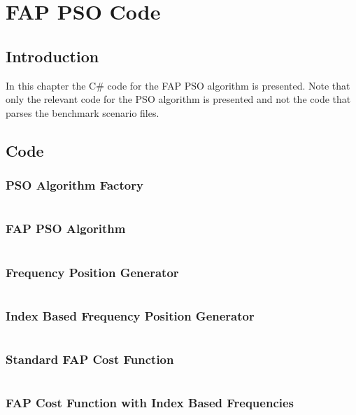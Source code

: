 \appendix
\label{chpt:apxFAPPSO}
\chapter{FAP PSO Code}
\section{Introduction}
In this chapter the C# code for the FAP PSO algorithm is presented. Note that only the relevant code for the PSO algorithm is presented and not the code that parses the benchmark scenario files.
\section{Code}
\subsection{PSO Algorithm Factory}
\inputminted[fontsize=\tiny]{csharp}{../Implementation/PSOFAP/PSOFAPConsole/FAPPSO/FAPPSOFactory.cs}
\subsection{FAP PSO Algorithm}
\inputminted[fontsize=\tiny]{csharp}{../Implementation/PSOFAP/PSOFAPConsole/FAPPSO/FAPPSOAlgorithm.cs}
\subsection{Frequency Position Generator}
\inputminted[fontsize=\tiny]{csharp}{../Implementation/PSOFAP/PSOFAPConsole/FAPPSO/FrequencyPositionGenerator.cs}
\subsection{Index Based Frequency Position Generator}
\inputminted[fontsize=\tiny]{csharp}{../Implementation/PSOFAP/PSOFAPConsole/FAPPSO/FrequencyIndexPositionGenerator.cs}
\subsection{Standard FAP Cost Function}
\inputminted[fontsize=\tiny]{csharp}{../Implementation/PSOFAP/PSOFAPConsole/FAPPSO/FAPCostFunction.cs}
\subsection{FAP Cost Function with Index Based Frequencies}
\inputminted[fontsize=\tiny]{csharp}{../Implementation/PSOFAP/PSOFAPConsole/FAPPSO/FAPIndexCostFunction.cs}

